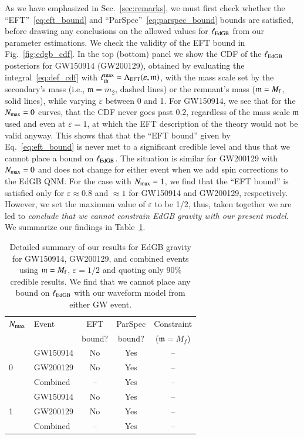 \documentclass[twocolumn,
               prd,
               aps,
               superscriptaddress,
               tightenlines,
               nofootinbib,
               eqsecnum,
               amsfonts,
               amsmath,
               longbibliography]{revtex4-1}
\newcommand{\gm}{\mathfrak{m}}
\begin{document}
As we have emphasized in Sec.~\ref{sec:remarks}, we must first check whether the
``EFT''~\eqref{eq:eft_bound} and ``ParSpec''~\eqref{eq:parspec_bound} bounds
are satisfied, before drawing any conclusions on the allowed values for
$\ell_{\rm EdGB}$ from our parameter estimations.
%
We check the validity of the EFT bound in Fig.~\ref{fig:edgb_cdf}. In the top (bottom) panel we show
the CDF of the $\ell_{\rm EdGB}$ posteriors for GW150914 (GW200129), obtained
by evaluating the integral~\eqref{eq:def_cdf} with $\ell^{\rm max}_{\rm th} = \Lambda_{\rm EFT}(\varepsilon, \mathfrak{m})$,
with the mass scale set by the secondary's mass (i.e., $\mathfrak{m} = m_2$, dashed lines) or
the remnant's mass ($\mathfrak{m} = M_{\rm f}$, solid lines), while varying $\varepsilon$ between 0 and 1.
%
For GW150914, we see that for the $N_{\rm max} = 0$ curves, that the CDF never goes
past $0.2$, regardless of the mass scale $\mathfrak{m}$ used and even at $\varepsilon =
1$, at which the EFT description of the theory would not be valid anyway.
%
This shows that that the ``EFT bound'' given by Eq.~\eqref{eq:eft_bound} is
never met to a significant credible level and thus that we cannot place a bound on
$\ell_{\rm EdGB}$.
%
The situation is similar for GW200129 with $N_{\rm max} = 0$ and does not
change for either event when we add spin corrections to the EdGB QNM.
%
For the case with $N_{\rm max} = 1$, we find that the ``EFT bound'' is satisfied
only for $\varepsilon \approx 0.8$ and $\approx1$ for GW150914 and GW200129, respectively.
However, we set the maximum value of $\varepsilon$ to be 1/2, thus,
taken together we are led to \emph{conclude that we cannot constrain EdGB gravity with our
present model}.
%
We summarize our findings in Table~\ref{tab:summary_edgb}.

\begin{table}[h]
\begin{tabular}{l l c c c}
\hline
\hline
$N_{\rm max}$ & Event &  EFT    & ParSpec & Constraint      \\
              &       &  bound? & bound?  & ($\gm = M_{f}$) \\
\hline
  & GW150914 & No  & Yes & -- \\
0 & GW200129 & No  & Yes & -- \\
  & Combined & --  & Yes & -- \\
\hline
  & GW150914 & No  & Yes & -- \\
1 & GW200129 & No  & Yes & -- \\
  & Combined & --  & Yes & -- \\
\hline
\hline
\end{tabular}
\caption{Detailed summary of our results for EdGB gravity for GW150914, GW200129, and
combined events using $\gm = M_{\rm f}$, $\varepsilon = 1/2$ and quoting only 90\% credible results.
%
We find that we cannot place any bound on $\ell_{\rm EdGB}$ with our waveform model from either GW event.
}
\label{tab:summary_edgb}
\end{table}
\end{document}
